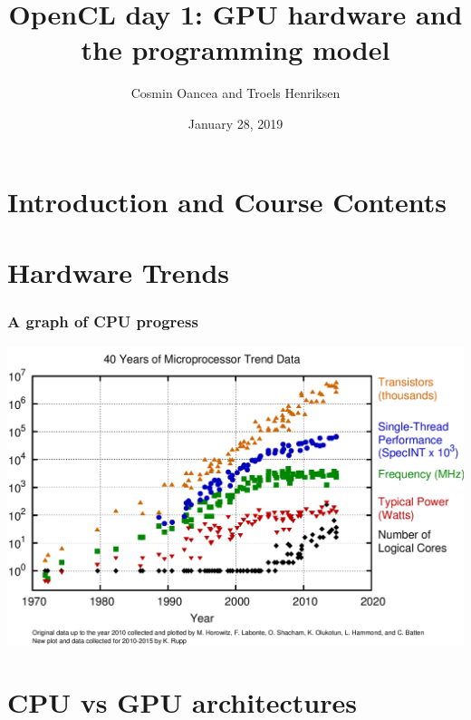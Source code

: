 \documentclass{beamer}
\title{OpenCL day 1: GPU hardware and the programming model}
\author{Cosmin Oancea and Troels Henriksen}
\date{January 28, 2019}
\begin{document}
\frame{\titlepage}

\section{Introduction and Course Contents}

\begin{frame}
  \tableofcontents[currentsection]
\end{frame}

\section{Hardware Trends}

\begin{frame}
	\tableofcontents[currentsection]
\end{frame}

\begin{frame}
  \frametitle{A graph of CPU progress}

  \includegraphics[width=\textwidth]{img/40-years-processor-trend.png}

\end{frame}

\section{CPU vs GPU architectures}

\begin{frame}
	\tableofcontents[currentsection]
\end{frame}
\end{document}
